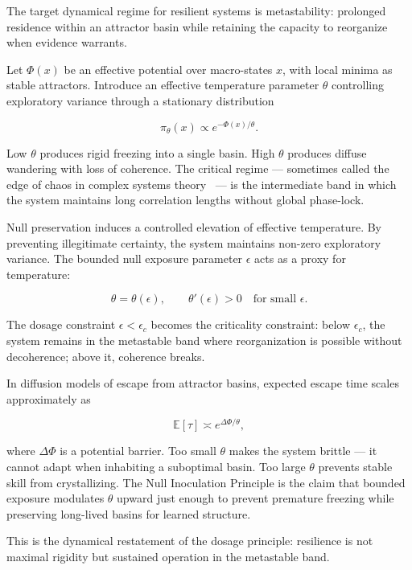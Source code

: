 \documentclass[11pt]{article}
\theoremstyle{remark}
\begin{document}
The target dynamical regime for resilient systems is metastability: prolonged residence within an attractor basin while retaining the capacity to reorganize when evidence warrants.

Let $\Phi(x)$ be an effective potential over macro-states $x$, with local minima as stable attractors. Introduce an effective temperature parameter $\theta$ controlling exploratory variance through a stationary distribution

\[
\pi_\theta(x) \propto e^{-\Phi(x)/\theta}.
\]

Low $\theta$ produces rigid freezing into a single basin. High $\theta$ produces diffuse wandering with loss of coherence. The critical regime --- sometimes called the edge of chaos in complex systems theory~\cite{langton} --- is the intermediate band in which the system maintains long correlation lengths without global phase-lock.

Null preservation induces a controlled elevation of effective temperature. By preventing illegitimate certainty, the system maintains non-zero exploratory variance. The bounded null exposure parameter $\epsilon$ acts as a proxy for temperature:

\[
\theta = \theta(\epsilon), \qquad \theta'(\epsilon) > 0 \quad \text{for small } \epsilon.
\]

The dosage constraint $\epsilon < \epsilon_c$ becomes the criticality constraint: below $\epsilon_c$, the system remains in the metastable band where reorganization is possible without decoherence; above it, coherence breaks.

In diffusion models of escape from attractor basins, expected escape time scales approximately as

\begin{equation}
\mathbb{E}[\tau] \asymp e^{\Delta\Phi / \theta},
\label{eq:escape}
\end{equation}

where $\Delta\Phi$ is a potential barrier. Too small $\theta$ makes the system brittle --- it cannot adapt when inhabiting a suboptimal basin. Too large $\theta$ prevents stable skill from crystallizing. The Null Inoculation Principle is the claim that bounded exposure modulates $\theta$ upward just enough to prevent premature freezing while preserving long-lived basins for learned structure.

This is the dynamical restatement of the dosage principle: resilience is not maximal rigidity but sustained operation in the metastable band.
\end{document}
